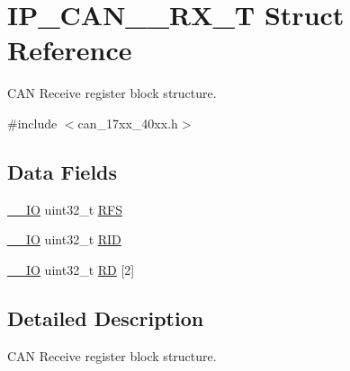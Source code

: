 \hypertarget{structIP__CAN__001__RX__T}{\section{I\-P\-\_\-\-C\-A\-N\-\_\-\_\-\-R\-X\-\_\-\-T Struct Reference}
\label{structIP__CAN__001__RX__T}
}


C\-A\-N Receive register block structure.  




{\ttfamily \#include $<$can\-\_\-17xx\-\_\-40xx.\-h$>$}

\subsection*{Data Fields}
\begin{DoxyCompactItemize}
\item 
\hyperlink{core__cm3_8h_aec43007d9998a0a0e01faede4133d6be}{\-\_\-\-\_\-\-I\-O} uint32\-\_\-t \hyperlink{structIP__CAN__001__RX__T_aa5c1bc243bb1763d92e9070d84b594cf}{R\-F\-S}
\item 
\hyperlink{core__cm3_8h_aec43007d9998a0a0e01faede4133d6be}{\-\_\-\-\_\-\-I\-O} uint32\-\_\-t \hyperlink{structIP__CAN__001__RX__T_a9b8287992a2f69010823997db04d7ef6}{R\-I\-D}
\item 
\hyperlink{core__cm3_8h_aec43007d9998a0a0e01faede4133d6be}{\-\_\-\-\_\-\-I\-O} uint32\-\_\-t \hyperlink{structIP__CAN__001__RX__T_a7b9fd4220efbbd69d33c81d887803b69}{R\-D} \mbox{[}2\mbox{]}
\end{DoxyCompactItemize}


\subsection{Detailed Description}
C\-A\-N Receive register block structure. 

